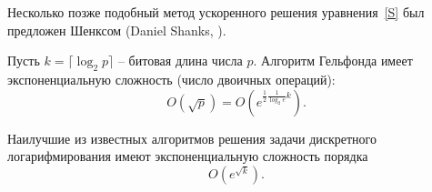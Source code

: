 Несколько позже подобный метод ускоренного решения уравнения~\ref{S} был предложен Шенксом (Daniel Shanks, \cite{Shanks:1971}).

Пусть $k = \lceil \log_2 p \rceil$ -- битовая длина числа $p$. Алгоритм Гельфонда имеет экспоненциальную сложность (число двоичных операций):
    \[ O\left(\sqrt{p}\right) = O\left(e^{\frac{1}{2} \frac{1}{\log_2 e} k}\right). \]

Наилучшие из известных алгоритмов решения задачи дискретного логарифмирования имеют экспоненциальную сложность порядка
    \[ O\left(e^{\sqrt{k}}\right). \]

